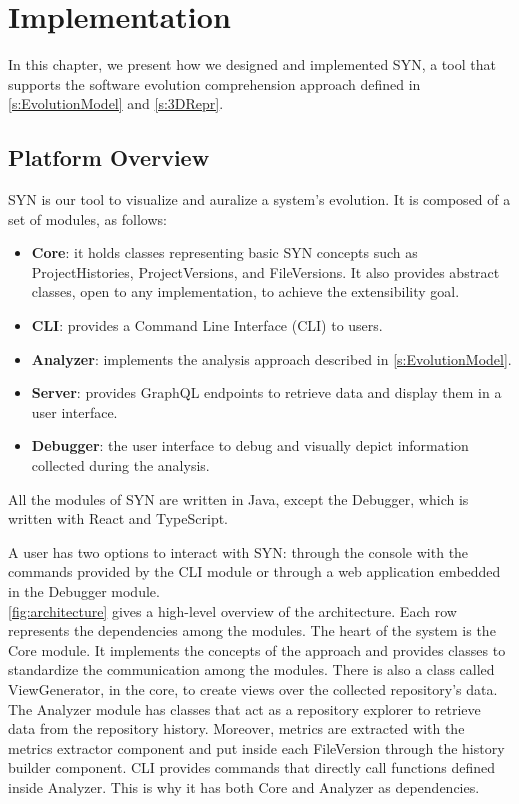 
\chapter[Implementation]{Implementation}
\graphicspath{ {images/implementation} }
In this chapter, we present how we designed and implemented SYN, a tool that supports the software evolution comprehension approach 
defined in \autoref{s:EvolutionModel} and \autoref{s:3DRepr}. 


\section{Platform Overview}
SYN is our tool to visualize and auralize a system's evolution. 
It is composed of a set of modules, as follows:
\begin{itemize}
    \item \textbf{Core}: it holds classes representing basic SYN concepts such as ProjectHistories, ProjectVersions, and FileVersions. It also provides abstract classes, open to any implementation, to achieve the extensibility goal.
    \item \textbf{CLI}: provides a Command Line Interface (CLI) to users.
    \item \textbf{Analyzer}: implements the analysis approach described in \autoref{s:EvolutionModel}. 
    \item \textbf{Server}: provides GraphQL endpoints to retrieve data and display them in a user interface. 
    \item \textbf{Debugger}: the user interface to debug and visually depict information collected during the analysis. 
\end{itemize}

All the modules of SYN are written in Java, except the Debugger, which is written with React and TypeScript. 

A user has two options to interact with SYN: through the console with the commands provided by the CLI module 
or through a web application embedded in the Debugger module. \\
\autoref{fig:architecture} gives a high-level overview of the architecture. Each row represents the dependencies among the modules.
The heart of the system is the Core module. It implements the concepts of the approach and provides classes to standardize the communication among the modules.
There is also a class called ViewGenerator, in the core, to create views over the collected repository's data.
The Analyzer module has classes that act as a repository explorer to retrieve data from the repository history. 
Moreover, metrics are extracted with the metrics extractor component and put inside each FileVersion through the history builder component. 
CLI provides commands that directly call functions defined inside Analyzer. 
This is why it has both Core and Analyzer as dependencies. 

